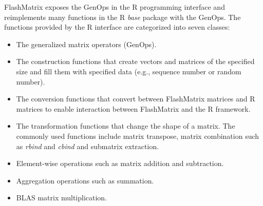 FlashMatrix exposes the GenOps in the R programming interface and reimplements
many functions in the R \textit{base} package with the GenOps. The functions
provided by the R interface are categorized into seven classes:
\begin{itemize}
	\item The generalized matrix operators (GenOps).
	\item The construction functions that create vectors and matrices of
		the specified size and fill them with specified data (e.g., sequence
		number or random number).
	\item The conversion functions that convert between FlashMatrix matrices and
		R matrices to enable interaction between FlashMatrix and the R framework.
	\item The transformation functions that change the shape of a matrix.
		The commonly used functions include matrix transpose, matrix combination
		such as \textit{rbind} and \textit{cbind} and submatrix extraction.
	\item Element-wise operations such as matrix addition and subtraction.
	\item Aggregation operations such as summation.
	\item BLAS matrix multiplication.
\end{itemize}




